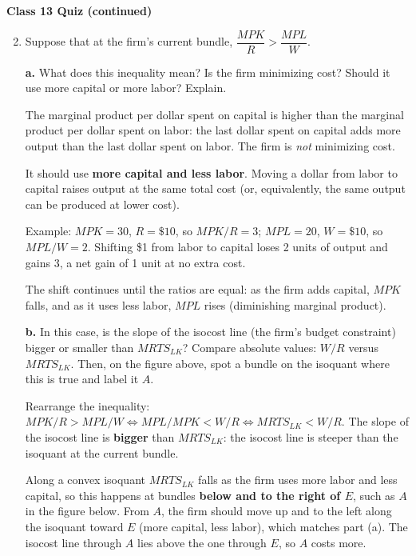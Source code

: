 \documentclass[11pt,a4paper]{article}
\newif\ifsolutions
\newcommand{\ans}[1]{\ifsolutions\else\par\vspace{0pt plus #1fill}\fi}
\newcommand{\continuepage}[1]{%
  \ifsolutions\par\else
  \newpage\pagestyle{plain}\thispagestyle{plain}
  \noindent\textbf{#1 (continued)}\par\medskip
  \fi}
\newcommand{\MPL}{\mathit{MPL}}
\newcommand{\MPK}{\mathit{MPK}}
\newcommand{\MRTS}{\mathit{MRTS}}
\begin{document}
\continuepage{Class 13 Quiz}

\begin{enumerate}\setcounter{enumi}{1}
\item Suppose that at the firm's current bundle, $\dfrac{\MPK}{R} > \dfrac{\MPL}{W}$.

\noindent\textbf{a.} What does this inequality mean? Is the firm minimizing cost? Should it use more capital or more labor? Explain.
\ans{3}

\begin{solution}
The marginal product per dollar spent on capital is higher than the marginal product per dollar spent on labor: the last dollar spent on capital adds more output than the last dollar spent on labor. The firm is \emph{not} minimizing cost.

It should use \textbf{more capital and less labor}. Moving a dollar from labor to capital raises output at the same total cost (or, equivalently, the same output can be produced at lower cost).

Example: $\MPK = 30$, $R = \$10$, so $\MPK/R = 3$; $\MPL = 20$, $W = \$10$, so $\MPL/W = 2$. Shifting \$1 from labor to capital loses 2 units of output and gains 3, a net gain of 1 unit at no extra cost.

The shift continues until the ratios are equal: as the firm adds capital, $\MPK$ falls, and as it uses less labor, $\MPL$ rises (diminishing marginal product).
\end{solution}

\noindent\textbf{b.} In this case, is the slope of the isocost line (the firm's budget constraint) bigger or smaller than $\MRTS_{LK}$? Compare absolute values: $W/R$ versus $\MRTS_{LK}$. Then, on the figure above, spot a bundle on the isoquant where this is true and label it $A$.
\ans{2}

\begin{solution}
Rearrange the inequality: $\MPK/R > \MPL/W \iff \MPL/\MPK < W/R \iff \MRTS_{LK} < W/R$. The slope of the isocost line is \textbf{bigger} than $\MRTS_{LK}$: the isocost line is steeper than the isoquant at the current bundle.

Along a convex isoquant $\MRTS_{LK}$ falls as the firm uses more labor and less capital, so this happens at bundles \textbf{below and to the right of $E$}, such as $A$ in the figure below. From $A$, the firm should move up and to the left along the isoquant toward $E$ (more capital, less labor), which matches part (a). The isocost line through $A$ lies above the one through $E$, so $A$ costs more.
\end{solution}


\end{enumerate}
\end{document}
